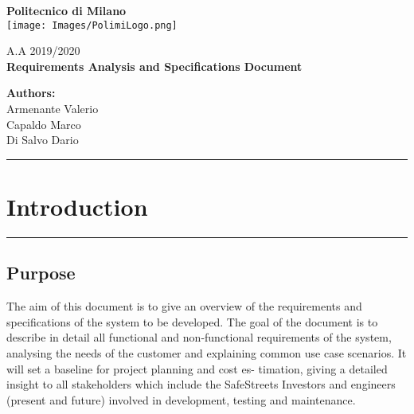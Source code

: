 \documentclass[12pt]{article}
\begin{document}
\onehalfspacing
\begin{center}
	{\huge {\textbf{Politecnico di Milano}}}
	 	\vspace{7mm}\\
	 	
 	 	\texttt{[image: Images/PolimiLogo.png]}
	\end{center}

\begin{center}
	     \vspace{5mm}
		{\Large A.A 2019/2020} 
		\vspace{5mm}\\
		{\Large {\textbf{Requirements Analysis and Specifications Document}}}   
		\vspace{35mm}\\ 
    \end{center}
          
\begin{flushright}
         
	 	 \vspace{20mm} 
	 	{\huge {\Large \textbf{Authors:}}}
	 	 \vspace{3mm}\\
	 	{\Large Armenante Valerio}
	 	 \vspace{1.5mm}\\
	 	{\Large Capaldo Marco}
	 	 \vspace{0.5mm}\\
	 	{\Large Di Salvo Dario}
	\end{flushright}



\newpage
\hrule
\tableofcontents

\vspace{0.5mm}
\vspace{0.24mm}

\newpage

\section{Introduction}
\hrule
\vspace{8mm}
\subsection{Purpose}
\vspace{5mm}
       The aim of this document is to give an overview of the             requirements and specifications of the system to be developed. The goal of the document is to describe in detail all functional and non-functional requirements of the system, analysing the needs of the customer and explaining common use case scenarios. It will set a baseline for project planning and cost es- timation, giving a detailed insight to all stakeholders which include the SafeStreets Investors and engineers (present and future) involved in development, testing and maintenance. 
\end{document}

